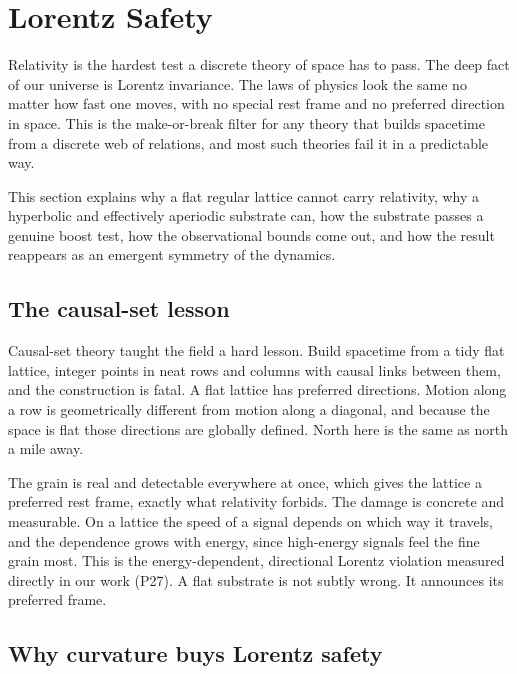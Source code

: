 \section{Lorentz Safety}

Relativity is the hardest test a discrete theory of space has to pass. The deep fact of our universe is
Lorentz invariance. The laws of physics look the same no matter how fast one moves, with no special rest
frame and no preferred direction in space. This is the make-or-break filter for any theory that builds
spacetime from a discrete web of relations, and most such theories fail it in a predictable way.

This section
explains why a flat regular lattice cannot carry relativity, why a hyperbolic and effectively aperiodic
substrate can, how the substrate passes a genuine boost test, how the observational bounds come out, and how
the result reappears as an emergent symmetry of the dynamics.

\subsection{The causal-set lesson}

Causal-set theory taught the field a hard lesson. Build spacetime from a tidy flat lattice, integer points in
neat rows and columns with causal links between them, and the construction is fatal. A flat lattice has
preferred directions. Motion along a row is geometrically different from motion along a diagonal, and because
the space is flat those directions are globally defined. North here is the same as north a mile away.

The
grain is real and detectable everywhere at once, which gives the lattice a preferred rest frame, exactly what
relativity forbids. The damage is concrete and measurable. On a lattice the speed of a signal depends on
which way it travels, and the dependence grows with energy, since high-energy signals feel the fine grain
most. This is the energy-dependent, directional Lorentz violation measured directly in our work (P27). A flat
substrate is not subtly wrong. It announces its preferred frame.

\subsection{Why curvature buys Lorentz safety}


